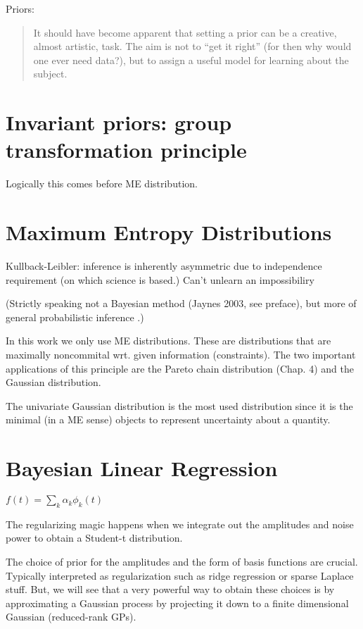 Priors:
\begin{quote}
It should have become apparent that setting a prior can be a creative, almost artistic,
task. The aim is not to “get it right” (for then why would one ever need data?), but to
assign a useful model for learning about the subject. \cite{Skilling2005}
\end{quote}

\section{Invariant priors: group transformation principle}

Logically this comes before ME distribution.

\section{Maximum Entropy Distributions}

Kullback-Leibler: inference is inherently asymmetric due to independence requirement (on which science is based.)
Can't unlearn an impossibiliry

(Strictly speaking not a Bayesian method (Jaynes 2003, see preface), but more of general probabilistic inference \citep{Knuth2012}.)

In this work we only use ME distributions.
These are distributions that are maximally noncommital wrt. given information (constraints).
The two important applications of this principle are the Pareto chain distribution (Chap. 4) and the Gaussian distribution.

The univariate Gaussian distribution is the most used distribution since it is the minimal (in a ME sense) objects to represent uncertainty about a quantity.

\section{Bayesian Linear Regression}

\citep{Fitzgerald1999}

$f(t) = \sum_k \alpha_k \phi_k(t)$

The regularizing magic happens when we integrate out the amplitudes and noise power to obtain a Student-t distribution.

The choice of prior for the amplitudes and the form of basis functions are crucial.
Typically interpreted as regularization such as ridge regression or sparse Laplace stuff.
But, we will see that a very powerful way to obtain these choices is by approximating a Gaussian process by projecting it down to a finite dimensional Gaussian (reduced-rank GPs).

